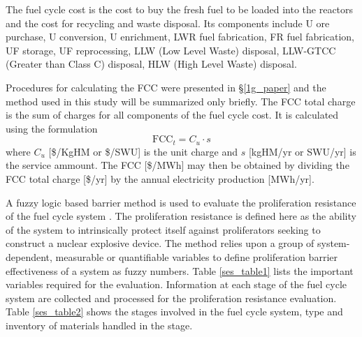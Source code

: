 The fuel cycle cost is the cost to buy the fresh fuel to be loaded into
the reactors and the cost for recycling and waste disposal.  Its
components include U ore purchase, U conversion, U enrichment, LWR fuel
fabrication, FR fuel fabrication, UF storage, UF reprocessing, LLW
(Low Level Waste) disposal, LLW-GTCC (Greater than Class C) disposal,
HLW (High Level Waste) disposal. 

Procedures for calculating the FCC were presented in \S \ref{1g_paper} and the
method used in this study will be summarized only briefly.  The FCC
total charge is the sum of charges for all components of the fuel cycle
cost.  It is calculated using the formulation
\begin{equation}
\label{ses_FCC}
\mbox{FCC}_t = C_u \cdot s
\end{equation}
where $C_u$ [\$/KgHM or \$/SWU] is the unit charge and $s$ [kgHM/yr or SWU/yr] 
is the service ammount. The FCC [\$/MWh] may then be obtained by dividing the 
FCC total charge [\$/yr] by the annual electricity production [MWh/yr].

A fuzzy logic based barrier method is used to evaluate the
proliferation resistance of the fuel cycle system \cite{Li2009}. The proliferation
resistance is defined here as the ability of the system to intrinsically
protect itself against proliferators seeking to construct a nuclear
explosive device. The method relies upon a group of system-dependent,
measurable or quantifiable variables to define proliferation barrier
effectiveness of a system as fuzzy numbers. 
Table \ref{ses_table1} lists the important variables required for
the evaluation. Information at each stage of the fuel cycle system are
collected and processed for the proliferation resistance evaluation.
Table \ref{ses_table2} shows the stages involved in the fuel cycle system, type and
inventory of materials handled in the stage.



